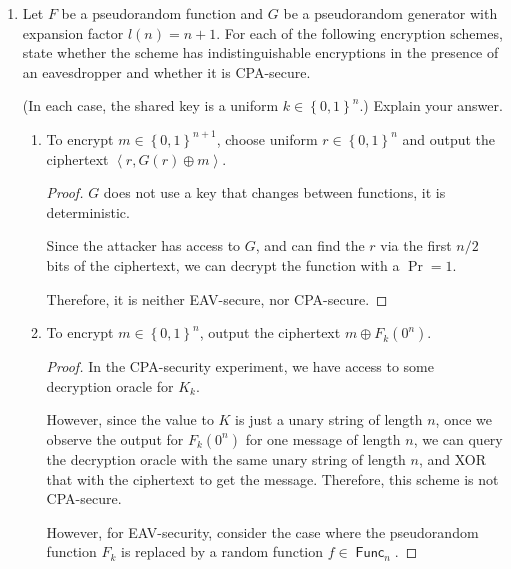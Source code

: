 \documentclass{article}
\DeclareMathOperator{\Func}{\textsf{Func}}
\begin{document}
\begin{enumerate}
  \item Let $F$ be a pseudorandom function and $G$ be a pseudorandom generator
    with expansion factor $l(n) = n + 1$. For each of the following encryption
    schemes, state whether the scheme has indistinguishable encryptions in the
    presence of an eavesdropper and whether it is CPA-secure.

    (In each case, the shared key is a uniform $k \in \left\{0, 1\right\}^n$.)
    Explain your answer.


    \begin{enumerate}
      \item To encrypt $m \in \left\{0, 1\right\}^{n + 1}$, choose uniform $r
        \in \left\{0, 1\right\}^n$ and output the ciphertext $\left\langle r,
          G(r) \oplus m\right\rangle$.

          \begin{proof}
            $G$ does not use a key that changes between functions, it is
            deterministic.

            Since the attacker has access to $G$, and can find the $r$ via the
            first $n / 2$ bits of the ciphertext, we can decrypt the function
            with a $\Pr = 1$.

            Therefore, it is neither EAV-secure, nor CPA-secure.
          \end{proof}

        \item To encrypt $m \in \left\{0, 1\right\}^n$, output the ciphertext $m
          \oplus F_k(0^n)$.

          \begin{proof}
            In the CPA-security experiment, we have access to some decryption
            oracle for $K_k$.

            However, since the value to $K$ is just a unary string of length
            $n$, once we observe the output for $F_k(0^n)$ for one message of
            length $n$, we can query the decryption oracle with the same unary
            string of length $n$, and XOR that with the ciphertext to get the
            message. Therefore, this scheme is not CPA-secure.

            However, for EAV-security, consider the case where the pseudorandom
            function $F_k$ is replaced by a random function $f \in \Func_n$.


\end{proof}
\end{enumerate}
\end{enumerate}
\end{document}
